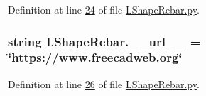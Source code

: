Definition at line \hyperlink{LShapeRebar_8py_source_l00024}{24} of file \hyperlink{LShapeRebar_8py_source}{L\+Shape\+Rebar.\+py}.

\subsubsection[{\texorpdfstring{\+\_\+\+\_\+url\+\_\+\+\_\+}{__url__}}]{\setlength{\rightskip}{0pt plus 5cm}string L\+Shape\+Rebar.\+\_\+\+\_\+url\+\_\+\+\_\+ = \char`\"{}https\+://www.\+freecadweb.\+org\char`\"{}\hspace{0.3cm}{\ttfamily [private]}}\hypertarget{namespaceLShapeRebar_a7bca929f0dda68928d1f3978b4e877f8}{}\label{namespaceLShapeRebar_a7bca929f0dda68928d1f3978b4e877f8}


Definition at line \hyperlink{LShapeRebar_8py_source_l00026}{26} of file \hyperlink{LShapeRebar_8py_source}{L\+Shape\+Rebar.\+py}.

